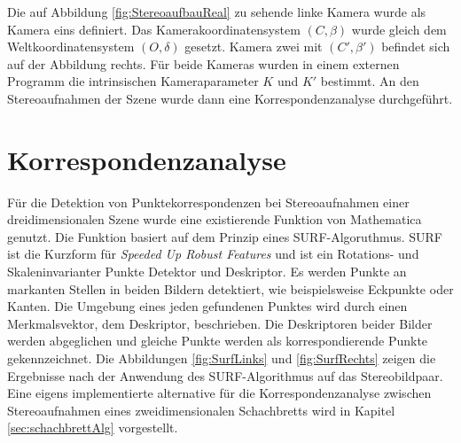 Die auf Abbildung \ref{fig:StereoaufbauReal} zu sehende linke Kamera wurde als Kamera eins definiert. Das Kamerakoordinatensystem $(C,\beta)$ wurde gleich dem Weltkoordinatensystem $(O,\delta)$ gesetzt. Kamera zwei mit $(C',\beta')$ befindet sich auf der Abbildung rechts. Für beide Kameras wurden in einem externen Programm die intrinsischen Kameraparameter $K$ und $K'$ bestimmt. An den Stereoaufnahmen der Szene wurde dann eine Korrespondenzanalyse durchgeführt.   

\section{Korrespondenzanalyse}


Für die Detektion von Punktekorrespondenzen bei Stereoaufnahmen einer dreidimensionalen Szene wurde eine existierende Funktion von Mathematica genutzt\cite{Mathematica}. Die Funktion basiert auf dem Prinzip eines SURF-Algoruthmus. SURF ist die Kurzform für \textit{Speeded Up Robust Features} und ist ein Rotations- und Skaleninvarianter Punkte Detektor und Deskriptor\cite{SURF,SIFTSURF}. Es werden Punkte an markanten Stellen in beiden Bildern detektiert, wie beispielsweise Eckpunkte oder Kanten. Die Umgebung eines jeden gefundenen Punktes wird durch einen Merkmalsvektor, dem Deskriptor, beschrieben. Die Deskriptoren beider Bilder werden abgeglichen und gleiche Punkte werden als korrespondierende Punkte gekennzeichnet\cite{SURF,SIFTSURF}. Die Abbildungen \ref{fig:SurfLinks} und \ref{fig:SurfRechts} zeigen die Ergebnisse nach der Anwendung des SURF-Algorithmus auf das Stereobildpaar. Eine eigens implementierte alternative für die Korrespondenzanalyse zwischen Stereoaufnahmen eines zweidimensionalen Schachbretts wird in Kapitel \ref{sec:schachbrettAlg} vorgestellt.  


